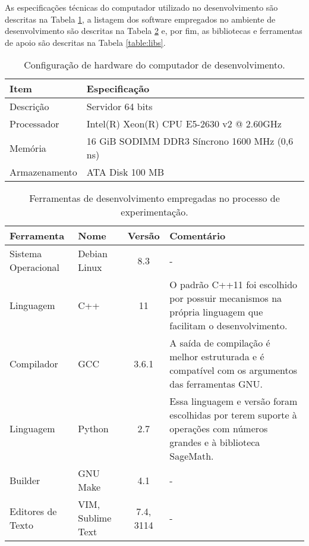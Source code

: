 As especificações técnicas do computador utilizado no desenvolvimento são descritas na Tabela \ref{table:config}, a listagem dos software empregados no ambiente de desenvolvimento são descritas na Tabela \ref{table:tools} e, por fim, as bibliotecas e ferramentas de apoio são descritas na Tabela \ref{table:libs}.

\begin{table}[!ht]
\centering
\begin{tabular}{ll}
\toprule
\textbf{Item}        & \textbf{Especificação}                        \\ \midrule
Descrição            & Servidor 64 bits                              \\
\rowcolor[gray]{0.9}
Processador          & Intel(R) Xeon(R) CPU E5-2630 v2 @ 2.60GHz     \\
Memória              & 16 GiB SODIMM DDR3 Síncrono 1600 MHz (0,6 ns) \\
\rowcolor[gray]{0.9}
Armazenamento        & ATA Disk 100 MB                               \\
\bottomrule
\end{tabular}
\caption{Configuração de hardware do computador de desenvolvimento.}
\label{table:config}
\end{table}

%
%
\begin{table}[!ht]
\centering
    \begin{tabularx}{0.95\textwidth}{llcX}
    \toprule
        \textbf{Ferramenta} & {\textbf{Nome}} & \textbf{Versão} & \textbf{Comentário}  \\
    \midrule
        Sistema Operacional  & Debian Linux      & 8.3       & -                                                            \\
        \rowcolor[gray]{0.9}
        Linguagem            & C++               & 11        & O padrão C++11 foi escolhido por possuir mecanismos na própria linguagem que facilitam o desenvolvimento. \\
        Compilador           & GCC               & 3.6.1     & A saída de compilação é melhor estruturada e é compatível com os argumentos das ferramentas GNU.          \\
        \rowcolor[gray]{0.9}
        Linguagem            & Python            & 2.7       & Essa linguagem e versão foram escolhidas por terem suporte à operações com números grandes e à biblioteca SageMath. \\
        Builder              & GNU Make          & 4.1       & -                                                                                                         \\
        \rowcolor[gray]{0.9}
        Editores de Texto    & VIM, Sublime Text & 7.4, 3114 & -                                                            \\
    \bottomrule

    \end{tabularx}
\caption{Ferramentas de desenvolvimento empregadas no processo de experimentação.}
\label{table:tools}

\end{table}

